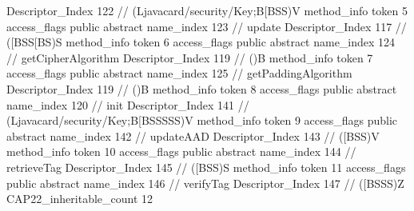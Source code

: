 {{{{{					Descriptor_Index	122		// (Ljavacard/security/Key;B[BSS)V
				}
				method_info {
					token	5
					access_flags	public abstract
					name_index	123		// update
					Descriptor_Index	117		// ([BSS[BS)S
				}
				method_info {
					token	6
					access_flags	public abstract
					name_index	124		// getCipherAlgorithm
					Descriptor_Index	119		// ()B
				}
				method_info {
					token	7
					access_flags	public abstract
					name_index	125		// getPaddingAlgorithm
					Descriptor_Index	119		// ()B
				}
				method_info {
					token	8
					access_flags	public abstract
					name_index	120		// init
					Descriptor_Index	141		// (Ljavacard/security/Key;B[BSSSSS)V
				}
				method_info {
					token	9
					access_flags	public abstract
					name_index	142		// updateAAD
					Descriptor_Index	143		// ([BSS)V
				}
				method_info {
					token	10
					access_flags	public abstract
					name_index	144		// retrieveTag
					Descriptor_Index	145		// ([BSS)S
				}
				method_info {
					token	11
					access_flags	public abstract
					name_index	146		// verifyTag
					Descriptor_Index	147		// ([BSSS)Z
				}
			}
			CAP22_inheritable_count	12
		}
	}
}
